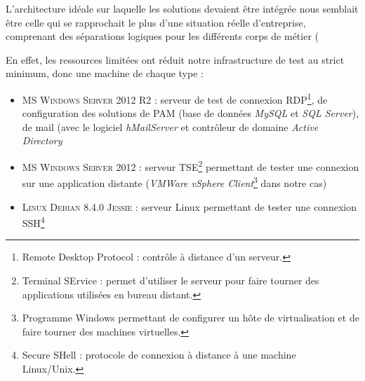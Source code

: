 L'architecture idéale sur laquelle les solutions devaient être intégrée nous semblait être celle qui se rapprochait le plus d'une situation réelle d'entreprise, comprenant des séparations logiques pour les différents corps de métier (

En effet, les ressources limitées ont réduit notre infrastructure de test au strict minimum, donc une machine de chaque type :
\begin{itemize}
	\item \textsc{MS Windows Server 2012 R2} : serveur de test de connexion RDP\footnote{Remote Desktop Protocol : contrôle à distance d'un serveur.}, de configuration des solutions de PAM (base de données \emph{MySQL} et \emph{SQL Server}), de mail (avec le logiciel \emph{hMailServer} \cite{hma} et contrôleur de domaine \emph{Active Directory}
	\item \textsc{MS Windows Server 2012} : serveur TSE\footnote{Terminal SErvice : permet d'utiliser le serveur pour faire tourner des applications utilisées en bureau distant.} permettant de tester une connexion sur une application distante (\emph{VMWare vSphere Client}\footnote{Programme Windows permettant de configurer un hôte de virtualisation et de faire tourner des machines virtuelles.} dans notre cas)
	\item \textsc{Linux Debian 8.4.0 Jessie} : serveur Linux permettant de tester une connexion SSH\footnote{Secure SHell : protocole de connexion à distance à une machine Linux/Unix.}
\end{itemize}

